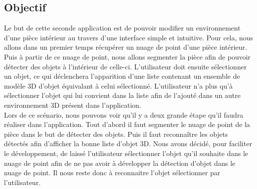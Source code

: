 
\subsection{Objectif}
Le but de cette seconde application est de pouvoir modifier un environnement d'une pièce intérieur au travers d'une interface
simple et intuitive. Pour cela, nous allons dans un premier temps récupérer un nuage de point d'une pièce intérieur. Puis à partir
de ce nuage de point, nous allons segmenter la pièce afin de pouvoir détecter des objets à l'intérieur de celle-ci.
L'utilisateur doit ensuite sélectionner un objet, ce qui déclenchera l'apparition d'une liste contenant un ensemble de modèle 3D
d'objet équivalant à celui sélectionné. L'utilisateur n'a plus qu'à sélectionner l'objet qui lui convient dans la liste
afin de l'ajouté dans un autre environnement 3D présent dans l'application.\\

Lors de ce scénario, nous pouvons voir qu'il y a deux grande étape qu'il faudra réaliser dans l'application. Tout d'abord il faut 
segmenter le nuage de point de la pièce dans le but de détecter des objets. Puis il faut reconnaître les objets détectés afin
d'afficher la bonne liste d'objet 3D. Nous avons décidé, pour faciliter le développement, de laissé l'utilisateur sélectionner
l'objet qu'il souhaite dans le nuage de point afin de ne pas avoir à développer la détection d'objet dans le nuage de point.
Il nous reste donc à reconnaitre l'objet sélectionner par l'utilisateur.

